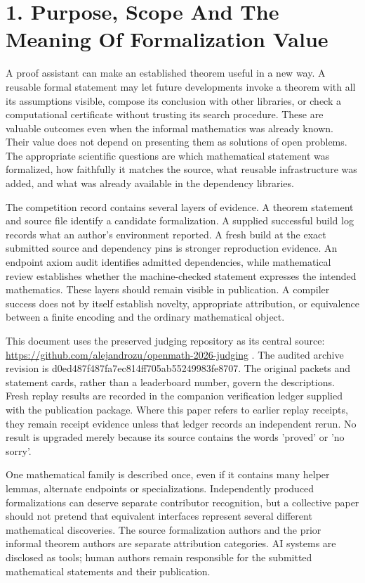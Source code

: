 \documentclass[11pt,a4paper]{article}
\begin{document}
\section{1. Purpose, Scope And The Meaning Of Formalization Value}
A proof assistant can make an established theorem useful in a new way. A reusable formal statement may let future developments invoke a theorem with all its assumptions visible, compose its conclusion with other libraries, or check a computational certificate without trusting its search procedure. These are valuable outcomes even when the informal mathematics was already known. Their value does not depend on presenting them as solutions of open problems. The appropriate scientific questions are which mathematical statement was formalized, how faithfully it matches the source, what reusable infrastructure was added, and what was already available in the dependency libraries.

The competition record contains several layers of evidence. A theorem statement and source file identify a candidate formalization. A supplied successful build log records what an author's environment reported. A fresh build at the exact submitted source and dependency pins is stronger reproduction evidence. An endpoint axiom audit identifies admitted dependencies, while mathematical review establishes whether the machine-checked statement expresses the intended mathematics. These layers should remain visible in publication. A compiler success does not by itself establish novelty, appropriate attribution, or equivalence between a finite encoding and the ordinary mathematical object.

This document uses the preserved judging repository as its central source: \url{https://github.com/alejandrozu/openmath-2026-judging} . The audited archive revision is d0ed487f487fa7ec814ff705ab55249983fe8707. The original packets and statement cards, rather than a leaderboard number, govern the descriptions. Fresh replay results are recorded in the companion verification ledger supplied with the publication package. Where this paper refers to earlier replay receipts, they remain receipt evidence unless that ledger records an independent rerun. No result is upgraded merely because its source contains the words 'proved' or 'no sorry'.

One mathematical family is described once, even if it contains many helper lemmas, alternate endpoints or specializations. Independently produced formalizations can deserve separate contributor recognition, but a collective paper should not pretend that equivalent interfaces represent several different mathematical discoveries. The source formalization authors and the prior informal theorem authors are separate attribution categories. AI systems are disclosed as tools; human authors remain responsible for the submitted mathematical statements and their publication.
\end{document}
